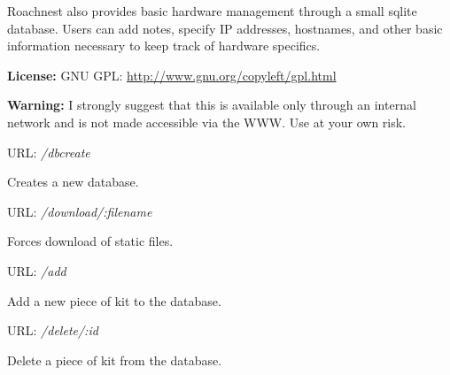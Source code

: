 \documentclass[letterpaper,10pt,english]{sphinxmanual}
\begin{document}
Roachnest also provides basic hardware management through a small sqlite database. Users can add
notes, specify IP addresses, hostnames, and other basic information necessary to keep track of
hardware specifics.

\textbf{License:} GNU GPL: \href{http://www.gnu.org/copyleft/gpl.html}{http://www.gnu.org/copyleft/gpl.html}

\textbf{Warning:} I strongly suggest that this is available only through an internal network and 
is not made accessible via the WWW. Use at your own risk.


\begin{fulllineitems}
\label{index:roachnest.create_db}
URL: \emph{/dbcreate}

Creates a new database.

\end{fulllineitems}



\begin{fulllineitems}
\label{index:roachnest.download}
URL: \emph{/download/:filename}

Forces download of static files.

\end{fulllineitems}



\begin{fulllineitems}
\label{index:roachnest.hardware_add}
URL: \emph{/add}

Add a new piece of kit to the database.

\end{fulllineitems}



\begin{fulllineitems}
\label{index:roachnest.hardware_edit}
URL: \emph{/delete/:id}

Delete a piece of kit from the database.

\end{fulllineitems}
\end{document}
